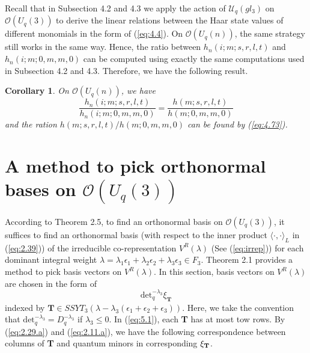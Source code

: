 \documentclass[table,a4paper,reqno]{amsart}
\numberwithin{equation}{section}
\newtheorem{corollary}[theorem]{Corollary}
\theoremstyle{definition}
\begin{document}
Recall that in Subsection 4.2 and 4.3 we apply the action of $\mathcal{U}_q(gl_3)$ on $\mathcal{O}(U_q(3))$ to derive the linear relations between the Haar state values of different monomials in the form of (\ref{eq:4.4}). On $\mathcal{O}(U_q(n))$, the same strategy still works in the same way. Hence, the ratio between $h_n(i;m;s,r,l,t)$ and $h_n(i;m;0,m,m,0)$ can be computed using exactly the same computations used in Subsection 4.2 and 4.3. Therefore, we have the following result.
\begin{corollary}
    On $\mathcal{O}(U_q(n))$, we have
    \begin{equation}
        \frac{h_n(i;m;s,r,l,t)}{h_n(i;m;0,m,m,0)}=\frac{h(m;s,r,l,t)}{h(m;0,m,m,0)}
    \end{equation}
    and the ration $h(m;s,r,l,t)/h(m;0,m,m,0)$ can be found by (\ref{eq:4.73}).
\end{corollary}


\section{A method to pick orthonormal bases on $\mathcal{O}({U_q(3)})$}
According to Theorem 2.5, to find an orthonormal basis on $\mathcal{O}({U_q(3)})$, it suffices to find an orthonormal basis (with respect to the inner product $\langle\cdot,\cdot\rangle_L$ in (\ref{eq:2.39})) of the irreducible co-representation $V^R(\lambda)$ (See (\ref{eq:irrep})) for each dominant integral weight $\lambda=\lambda_1\epsilon_1+\lambda_2\epsilon_2+\lambda_3\epsilon_3\in F_3$. Theorem 2.1 provides a method to pick basis vectors on $V^R(\lambda)$. In this section, basis vectors on $V^R(\lambda)$ are chosen in the form of 
\begin{equation}\label{eq:5.1}
    \text{det}_q^{-\lambda_3}\xi_{\textbf{T}}
\end{equation}
indexed by $\textbf{T}\in SSYT_3(\lambda-\lambda_3(\epsilon_1+\epsilon_2+\epsilon_3))$. Here, we take the convention that $\text{det}_q^{-\lambda_3}=D_q^{-\lambda_3}$ if $\lambda_3\le 0$. In (\ref{eq:5.1}), each \textbf{T} has at most tow rows. By (\ref{eq:2.29.a}) and (\ref{eq:2.11.a}), we have the following correspondence between columns of \textbf{T} and quantum minors in corresponding $\xi_\text{\textbf{T}}$.
\end{document}
